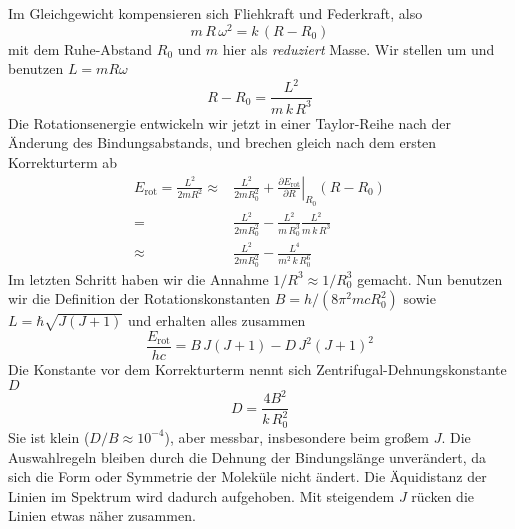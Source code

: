Im Gleichgewicht kompensieren sich Fliehkraft und Federkraft, also
\begin{equation}
 m \, R \, \omega^2 = k \, ( R - R_0)
\end{equation} 
mit dem Ruhe-Abstand $R_0$ und $m$ hier als \emph{reduziert} Masse. Wir stellen um und benutzen $L = m R \omega$
\begin{equation}
R - R_0 = \frac{L^2}{m \, k \, R^3  } 
\end{equation}
Die Rotationsenergie entwickeln wir jetzt in einer Taylor-Reihe nach der Änderung des Bindungsabstands, und brechen gleich nach dem ersten Korrekturterm ab
\begin{align}
 E_\text{rot} = \frac{L^2}{2 m R^2} \approx &
 \frac{L^2}{2 m R_0^2}  + \left. \frac{\partial E_\text{rot}}{\partial R}
 \right|_{R_0}  (R - R_0) \\
 = & \frac{L^2}{2 m R_0^2}  -  \frac{L^2}{m \, R_0^3  }   \frac{L^2}{m \, k \, R^3  } \\
  \approx & \frac{L^2}{2 m R_0^2}  -  \frac{L^4}{m^2 \, k\, R_0^6  }   
\end{align}
Im letzten Schritt haben wir die  Annahme $1/R^3 \approx 1 / R_0^3$ gemacht.
Nun benutzen wir die Definition der Rotationskonstanten $B = h / (8 \pi^2  m  c R_0^2)$ sowie $L = \hbar \sqrt{ J (J+1)}$ und erhalten alles zusammen
\begin{equation}
\frac{ E_\text{rot}}{h c} = B \, J (J+1) - D \, J^2 (J+1)^2
\end{equation}
Die Konstante vor dem Korrekturterm nennt sich Zentrifugal-Dehnungskonstante $D$
\begin{equation}
D = \frac{4 B^2}{k \, R_0^2}
\end{equation}
Sie ist klein ($D/B \approx 10^{-4}$), aber messbar, insbesondere beim großem $J$. Die Auswahlregeln bleiben durch die Dehnung der Bindungslänge unverändert, da sich die Form oder Symmetrie der Moleküle nicht ändert. Die Äquidistanz der Linien im Spektrum wird dadurch aufgehoben. Mit steigendem $J$ rücken die Linien etwas näher zusammen.

